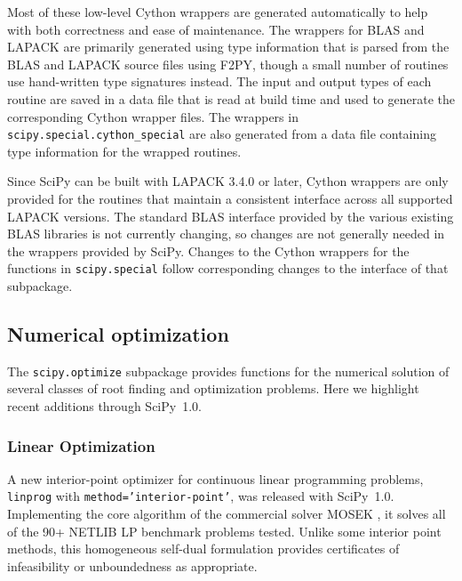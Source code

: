 \documentclass[fleqn,10pt]{wlscirep}
\begin{document}
Most of these low-level Cython wrappers are generated automatically to help
with both correctness and ease of maintenance.  The wrappers for BLAS and
LAPACK are primarily generated using type information that is parsed from the
BLAS and LAPACK source files using F2PY\cite{peterson2009f2py}, though a small
number of routines use hand-written type signatures instead.  The input and
output types of each routine are saved in a data file that is read at build
time and used to generate the corresponding Cython wrapper files.  The wrappers
in \texttt{scipy.{\allowbreak}special.{\allowbreak}cython\_special} are also
generated from a data file containing type information for the wrapped
routines.

Since SciPy can be built with LAPACK 3.4.0 or later, Cython wrappers are only
provided for the routines that maintain a consistent interface across all
supported LAPACK versions.  The standard BLAS interface provided by the various
existing BLAS libraries is not currently changing, so changes are not generally
needed in the wrappers provided by SciPy.  Changes to the Cython wrappers for
the functions in \texttt{scipy.{\allowbreak}special} follow corresponding
changes to the interface of that subpackage.

\subsection*{Numerical optimization}

\newcommand{\RR}{\ensuremath{\mathbb{R}}}
The \texttt{scipy.optimize} subpackage provides functions for the numerical
solution of several classes of root finding and optimization problems.
Here we highlight recent additions through SciPy~1.0.



\subsubsection*{Linear Optimization}

A new interior-point optimizer for continuous linear programming problems, \texttt{linprog} with \texttt{method='interior-point'}, was released with SciPy~1.0. Implementing the core algorithm of the commercial solver MOSEK \cite{andersen2000mosek}, it solves all of the 90+ NETLIB LP benchmark problems \cite{netlib} tested. Unlike some interior point methods, this homogeneous self-dual formulation provides certificates of infeasibility or unboundedness as appropriate.
\end{document}
